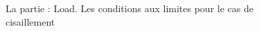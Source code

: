 \documentclass{article}
\begin{document}
\begin{figure}[H]
    \begin{minipage}[h]{0.47\linewidth}
    \end{minipage}
    \hfill
    \begin{minipage}[h]{0.47\linewidth}
    \end{minipage}
    \caption{La partie : Load. Les conditions aux limites pour le cas de cisaillement}
\end{figure}
\end{document}
